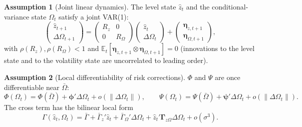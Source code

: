 \documentclass[11pt]{article}
\newcommand{\E}{\mathbb{E}}
\newcommand{\bs}[1]{\boldsymbol{#1}}
\theoremstyle{plain}
\theoremstyle{definition}
\newtheorem{assumption}{Assumption}
\begin{document}
\begin{assumption}[Joint linear dynamics]
\label{ass:joint-linear}
The level state $\hat z_t$ and the conditional-variance state $\Omega_t$
satisfy a joint VAR(1):
\[
\begin{pmatrix}\hat z_{t+1}\\ \Delta\Omega_{t+1}\end{pmatrix}
=
\begin{pmatrix}R_z & 0\\ 0 & R_\Omega\end{pmatrix}
\begin{pmatrix}\hat z_t\\ \Delta\Omega_t\end{pmatrix}
+
\begin{pmatrix}\bs{\eta}_{z,t+1}\\ \bs{\eta}_{\Omega,t+1}\end{pmatrix},
\]
with $\rho(R_z),\rho(R_\Omega)<1$ and $\E_t[\bs{\eta}_{z,t+1}\otimes
\bs{\eta}_{\Omega,t+1}]=0$ (innovations to the level state and to the volatility
state are uncorrelated to leading order).
\end{assumption}

\begin{assumption}[Local differentiability of risk corrections]
\label{ass:risk-diff}
$\Phi$ and $\Psi$ are once differentiable near $\bar\Omega$:
\[
\Phi(\Omega_t)=\Phi(\bar\Omega)+\bs{\phi}'\Delta\Omega_t+o(\|\Delta\Omega_t\|),
\qquad
\Psi(\Omega_t)=\Psi(\bar\Omega)+\bs{\psi}'\Delta\Omega_t+o(\|\Delta\Omega_t\|).
\]
The cross term has the bilinear local form
\[
\Gamma(\hat z_t,\Omega_t)=\bar\Gamma+\bar\Gamma_z'\hat z_t+\bar\Gamma_\Omega'
\Delta\Omega_t+\hat z_t'\bs{\Gamma}_{z\Omega}\Delta\Omega_t+o(\sigma^3).
\]
\end{assumption}
\end{document}
